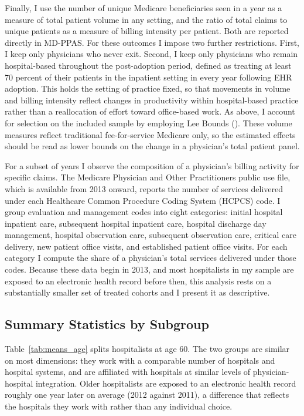 \documentclass[12pt]{article}
\begin{document}
Finally, I use the number of unique Medicare beneficiaries seen in a year as a measure of total patient volume in any setting, and the ratio of total claims to unique patients as a measure of billing intensity per patient. Both are reported directly in MD-PPAS. For these outcomes I impose two further restrictions. First, I keep only physicians who never exit. Second, I keep only physicians who remain hospital-based throughout the post-adoption period, defined as treating at least 70 percent of their patients in the inpatient setting in every year following EHR adoption. This holds the setting of practice fixed, so that movements in volume and billing intensity reflect changes in productivity within hospital-based practice rather than a reallocation of effort toward office-based work. As above, I account for selection on the included sample by employing Lee Bounds (\cite{lee2009training}). These volume measures reflect traditional fee-for-service Medicare only, so the estimated effects should be read as lower bounds on the change in a physician's total patient panel. 

For a subset of years I observe the composition of a physician's
billing activity for specific claims. The Medicare Physician and Other Practitioners public use file, which is
available from 2013 onward, reports the number of services delivered under each
 Healthcare Common Procedure Coding System (HCPCS) code. I group evaluation and management codes into eight categories:
initial hospital inpatient care, subsequent hospital inpatient care, hospital
discharge day management, hospital observation care, subsequent observation care,
critical care delivery, new patient office visits, and established patient office
visits. For each category I compute the share of a physician's total services
delivered under those codes. Because these data begin in 2013, and most
hospitalists in my sample are exposed to an electronic health record before then,
this analysis rests on a substantially smaller set of treated cohorts and I
present it as descriptive.


\subsection{Summary Statistics by Subgroup}

Table~\ref{tab:means_age} splits hospitalists at age 60. The two groups are
similar on most dimensions: they work with a comparable number of hospitals and hospital systems, and are affiliated with
hospitals at similar levels of physician-hospital integration. Older hospitalists
are exposed to an electronic health record roughly one year later on average
(2012 against 2011), a difference that reflects the hospitals they work with
rather than any individual choice.
\end{document}
